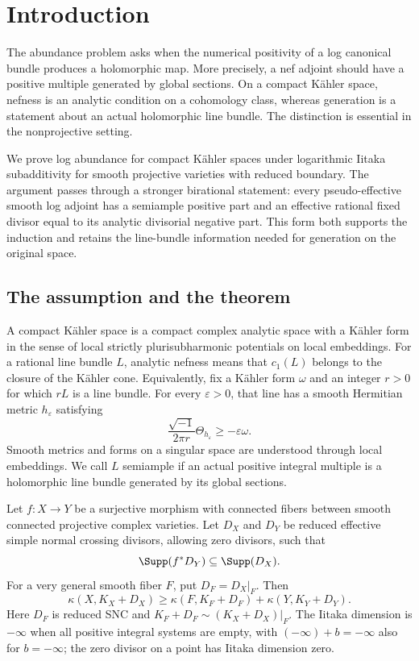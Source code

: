 \section{Introduction}\label{sec:introduction}

The abundance problem asks when the numerical positivity of a log canonical
bundle produces a holomorphic map. More precisely, a nef adjoint should have
a positive multiple generated by global sections. On a compact Kähler space,
nefness is an analytic condition on a cohomology class, whereas generation
is a statement about an actual holomorphic line bundle. The distinction is
essential in the nonprojective setting.

We prove log abundance for compact Kähler spaces under logarithmic Iitaka
subadditivity for smooth projective varieties with reduced boundary. The
argument passes through a stronger birational statement: every
pseudo-effective smooth log adjoint has a semiample positive part and an
effective rational fixed divisor equal to its analytic divisorial negative
part. This form both supports the induction and retains the line-bundle
information needed for generation on the original space.

\subsection{The assumption and the theorem}

A compact Kähler space is a compact complex analytic space with a Kähler
form in the sense of local strictly plurisubharmonic potentials on local
embeddings. For a rational line bundle \(L\), analytic nefness means that
\(c_1(L)\) belongs to the closure of the Kähler cone. Equivalently, fix a
Kähler form \(\omega\) and an integer \(r>0\) for which \(rL\) is a line
bundle. For every \(\varepsilon>0\), that line has a smooth Hermitian metric
\(h_\varepsilon\) satisfying
\[
 \frac{\sqrt{-1}}{2\pi r}\Theta_{h_\varepsilon}
 \geq-\varepsilon\omega.
\]
Smooth metrics and forms on a singular space are understood through local
embeddings. We call \(L\) semiample if an actual positive integral multiple
is a holomorphic line bundle generated by its global sections.

\begin{assumption}
\label{asm:log-iitaka}
Let \(f:X\to Y\) be a surjective morphism with connected fibers between
smooth connected projective complex varieties. Let \(D_X\) and \(D_Y\) be
reduced effective simple normal crossing divisors, allowing zero divisors,
such that
\[
 \Supp(f^*D_Y)\subseteq\Supp(D_X).
\]
For a very general smooth fiber \(F\), put \(D_F=D_X|_F\). Then
\[
 \kappa(X,K_X+D_X)\geq
 \kappa(F,K_F+D_F)+\kappa(Y,K_Y+D_Y).
\]
Here \(D_F\) is reduced SNC and
\(K_F+D_F\sim (K_X+D_X)|_F\). The Iitaka dimension is \(-\infty\) when
all positive integral systems are empty, with
\((-\infty)+b=-\infty\) also for \(b=-\infty\); the zero divisor on a
point has Iitaka dimension zero.
\end{assumption}

